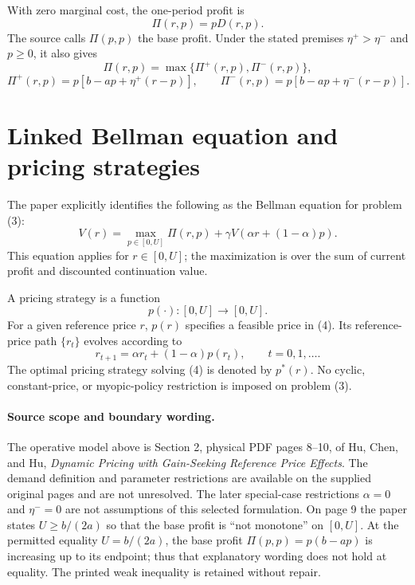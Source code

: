 \documentclass{article}
\begin{document}
With zero marginal cost, the one-period profit is
\[
\Pi(r,p)=pD(r,p).
\]
The source calls $\Pi(p,p)$ the base profit. Under the stated premises $\eta^+>\eta^-$ and $p\geq 0$, it also gives
\[
\Pi(r,p)=\max\{\Pi^+(r,p),\Pi^-(r,p)\},
\]
\[
\Pi^+(r,p)=p[b-ap+\eta^+(r-p)],\qquad
\Pi^-(r,p)=p[b-ap+\eta^-(r-p)].
\]

\section*{Linked Bellman equation and pricing strategies}
The paper explicitly identifies the following as the Bellman equation for problem (3):
\begin{equation}
V(r)=\max_{p\in[0,U]}\Pi(r,p)+\gamma V(\alpha r+(1-\alpha)p).
\tag{4}
\end{equation}
This equation applies for $r\in[0,U]$; the maximization is over the sum of current profit and discounted continuation value.

A pricing strategy is a function
\[
p(\cdot):[0,U]\longrightarrow[0,U].
\]
For a given reference price $r$, $p(r)$ specifies a feasible price in (4). Its reference-price path $\{r_t\}$ evolves according to
\[
r_{t+1}=\alpha r_t+(1-\alpha)p(r_t),\qquad t=0,1,\ldots.
\]
The optimal pricing strategy solving (4) is denoted by $p^*(r)$. No cyclic, constant-price, or myopic-policy restriction is imposed on problem (3).

\paragraph{Source scope and boundary wording.}
The operative model above is Section 2, physical PDF pages 8--10, of Hu, Chen, and Hu, \emph{Dynamic Pricing with Gain-Seeking Reference Price Effects}. The demand definition and parameter restrictions are available on the supplied original pages and are not unresolved. The later special-case restrictions $\alpha=0$ and $\eta^-=0$ are not assumptions of this selected formulation. On page 9 the paper states $U\geq b/(2a)$ so that the base profit is ``not monotone'' on $[0,U]$. At the permitted equality $U=b/(2a)$, the base profit $\Pi(p,p)=p(b-ap)$ is increasing up to its endpoint; thus that explanatory wording does not hold at equality. The printed weak inequality is retained without repair.
\end{document}
